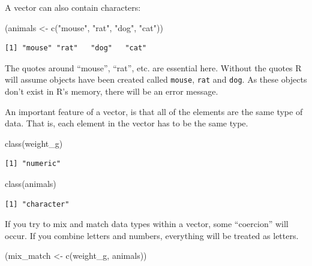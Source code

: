 \documentclass[
  letterpaper,
  DIV=11,
  numbers=noendperiod,
  oneside]{scrreprt}
\newenvironment{Shaded}{\begin{snugshade}}{\end{snugshade}}
\newcommand{\FunctionTok}[1]{\textcolor[rgb]{0.28,0.35,0.67}{#1}}
\newcommand{\NormalTok}[1]{\textcolor[rgb]{0.00,0.23,0.31}{#1}}
\newcommand{\OtherTok}[1]{\textcolor[rgb]{0.00,0.23,0.31}{#1}}
\newcommand{\StringTok}[1]{\textcolor[rgb]{0.13,0.47,0.30}{#1}}
\begin{document}
A vector can also contain characters:

\begin{Shaded}
\begin{Highlighting}[]
\NormalTok{(animals }\OtherTok{\textless{}{-}} \FunctionTok{c}\NormalTok{(}\StringTok{"mouse"}\NormalTok{, }\StringTok{"rat"}\NormalTok{, }\StringTok{"dog"}\NormalTok{, }\StringTok{"cat"}\NormalTok{))}
\end{Highlighting}
\end{Shaded}

\begin{verbatim}
[1] "mouse" "rat"   "dog"   "cat"  
\end{verbatim}

The quotes around ``mouse'', ``rat'', etc. are essential here. Without
the quotes R will assume objects have been created called
\texttt{mouse}, \texttt{rat} and \texttt{dog}. As these objects don't
exist in R's memory, there will be an error message.

An important feature of a vector, is that all of the elements are the
same type of data. That is, each element in the vector has to be the
same type.

\begin{Shaded}
\begin{Highlighting}[]
\FunctionTok{class}\NormalTok{(weight\_g)}
\end{Highlighting}
\end{Shaded}

\begin{verbatim}
[1] "numeric"
\end{verbatim}

\begin{Shaded}
\begin{Highlighting}[]
\FunctionTok{class}\NormalTok{(animals)}
\end{Highlighting}
\end{Shaded}

\begin{verbatim}
[1] "character"
\end{verbatim}

If you try to mix and match data types within a vector, some
``coercion'' will occur. If you combine letters and numbers, everything
will be treated as letters.

\begin{Shaded}
\begin{Highlighting}[]
\NormalTok{(mix\_match }\OtherTok{\textless{}{-}} \FunctionTok{c}\NormalTok{(weight\_g, animals))}
\end{Highlighting}
\end{Shaded}
\end{document}

